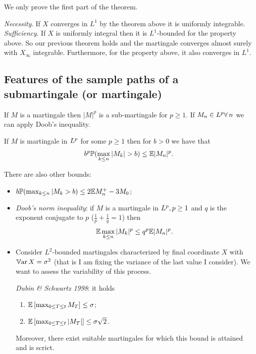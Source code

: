 \documentclass{report}
\begin{document}
We only prove the first part of the theorem.
\begin{fancyproof}
	\emph{Necessity}. If $X$ converges in $L^{1}$ by the theorem above it is uniformly integrable.\\
	\emph{Sufficiency}. If $X$ is uniformly integral then it is $L^{1}$-bounded for the property above. So our previous theorem holds and the martingale converges almost surely with $X_{\infty}$ integrable. Furthermore, for the property above, it also converges in $L^{1}$.
\end{fancyproof}
\subsection{Features of the sample paths of a submartingale (or martingale)}
\begin{remark}
	If $M$ is a martingale then $|M|^{p}$ is a sub-martingale for $p\geq1$. If $M_{n}\in L^{p}\forall\, n$ we can apply Doob's inequality.
\end{remark}
\begin{corollary}
	If $M$ is martingale in $L^{p}$ for some $p\geq 1$ then for $b>0$ we have that
	\begin{equation*}
		b^{p}\pr(\max_{k\leq n}|M_{k}|>b)\leq\ev|M_{n}|^{p}.
	\end{equation*}
\end{corollary}
There are also other bounds:
\begin{itemize}
	\item $b\mathbb{P}(\max_{k\leq n}|M_{k}>b)\leq 2\mathbb{E} M_{n}^{+}-3M_{0}$;
	\item \emph{Doob's norm inequality}: if $M$ is a martingale in $L^{p},p\geq 1$ and $q$ is the exponent conjugate to $p$ ($\frac{1}{p}+\frac{1}{q}=1$) then
	\begin{equation*}
		\mathbb{E}\max_{  k\leq n}|M_{k}|^{p}\leq q^{p}\mathbb{E}|M_{n}|^{p}.
	\end{equation*}
	\item  Consider $L^{2}$-bounded martingales characterized by final coordinate $X$ with $\mathbb{V}\mathrm{ar}\, X=\sigma^{2}$ (that is I am fixing the variance of the last value I consider). We want to assess the variability of this process.
	\begin{theorem}
		\emph{Dubin \& Schwartz 1998}: it holds
		\begin{enumerate}
			\item $\mathbb{E}\left[\max_{0\leq T\leq t}M_{T}\right]\leq\sigma$;
			\item $\mathbb{E}\left[\max_{0\leq T\leq t}|M_{T}|\right]\leq\sigma\sqrt{2}$.
		\end{enumerate}
		Moreover, there exist suitable martingales for which this bound is attained and is scrict.
	\end{theorem}
\end{itemize}
\end{document}

